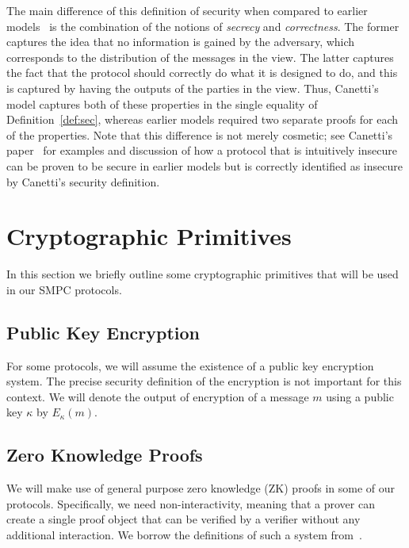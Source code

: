 \documentclass{article}
\theoremstyle{remark}
\begin{document}
The main difference of this definition of security when compared to earlier
models~\cite{gmr89,mr92,b92} is the combination of the notions of
\textit{secrecy} and \textit{correctness}. The former captures the idea that no
information is gained by the adversary, which corresponds to the distribution
of the messages in the view. The latter captures the fact that the protocol
should correctly do what it is designed to do, and this is captured by having
the outputs of the parties in the view. Thus, Canetti's model captures both of
these properties in the single equality of Definition~\ref{def:sec}, whereas
earlier models required two separate proofs for each of the properties. Note
that this difference is not merely cosmetic; see Canetti's paper~\cite{c00} for
examples and discussion of how a protocol that is intuitively insecure can be
proven to be secure in earlier models but is correctly identified as insecure
by Canetti's security definition.

\section{Cryptographic Primitives}

In this section we briefly outline some cryptographic primitives that will be
used in our SMPC protocols.

\subsection{Public Key Encryption}

\newcommand{\encrypt}[2]{E_{#1}\left(#2\right)}

For some protocols, we will assume the existence of a public key encryption
system. The precise security definition of the encryption is not important for
this context. We will denote the output of encryption of a message $m$ using a
public key $\kappa$ by $\encrypt{\kappa}{m}$.

\subsection{Zero Knowledge Proofs}

We will make use of general purpose zero knowledge (ZK) proofs in some of our
protocols. Specifically, we need non-interactivity, meaning that a prover can
create a single proof object that can be verified by a verifier without any
additional interaction. We borrow the definitions of such a system
from~\cite{g16}.
\end{document}
